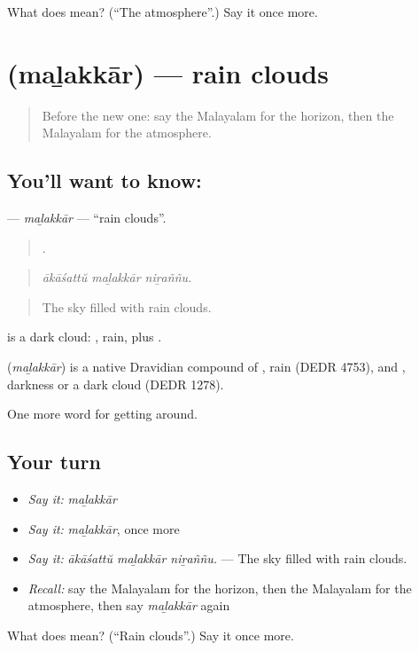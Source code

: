 \begin{tcolorbox}[breakable,colback=teal!4,colframe=teal!35!black,title={Before you move on}]
What does  mean? (\textquotedblleft{}The atmosphere\textquotedblright{}.) Say it once more.
\end{tcolorbox}
\section[\texorpdfstring{\ml{മഴക്കാർ} (maḻakkār)}{മഴക്കാർ (maḻakkār)}]{ (maḻakkār) — rain clouds}

\label{lesson:ML-C506-malakkar}



\begin{quote}
Before the new one: say the Malayalam for the horizon, then the Malayalam for the atmosphere.
\end{quote}

\subsection*{You'll want to know: }
\textbf{} — \emph{maḻakkār} — \textquotedblleft{}rain clouds\textquotedblright{}.

\begin{quote}
  .
\end{quote}

\begin{quote}
\emph{ākāśattŭ maḻakkār niṟaññu.}
\end{quote}

\begin{quote}
The sky filled with rain clouds.
\end{quote}

 is a dark cloud: , rain, plus .

\begin{cousinweb}
\textbf{} (\emph{maḻakkār}) is a native Dravidian compound of , rain (DEDR 4753), and , darkness or a dark cloud (DEDR 1278).
\end{cousinweb}

\begin{grammarlens}[title={What you've built}]
One more word for getting around.
\end{grammarlens}

\subsection*{Your turn}
\begin{itemize}
\raggedright
  \item \emph{Say it:} \emph{maḻakkār}
  \item \emph{Say it:} \emph{maḻakkār}, once more
  \item \emph{Say it:} \emph{ākāśattŭ maḻakkār niṟaññu.} — The sky filled with rain clouds.
  \item \emph{Recall:} say the Malayalam for the horizon, then the Malayalam for the atmosphere, then say \emph{maḻakkār} again
\end{itemize}

\begin{tcolorbox}[breakable,colback=teal!4,colframe=teal!35!black,title={Before you move on}]
What does  mean? (\textquotedblleft{}Rain clouds\textquotedblright{}.) Say it once more.
\end{tcolorbox}
